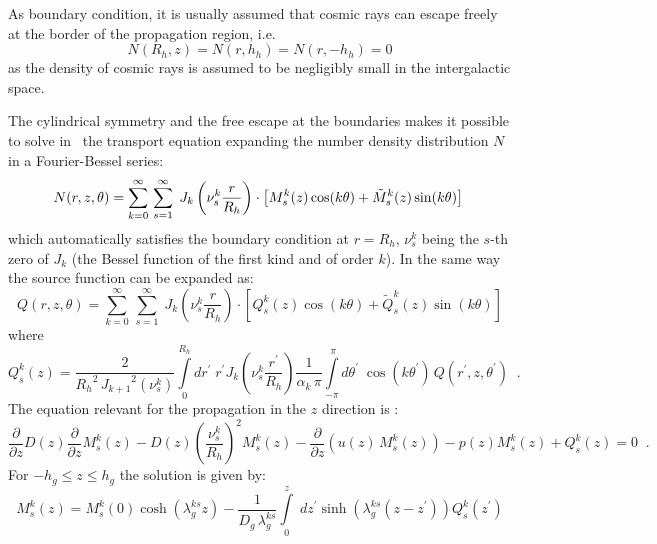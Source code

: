 As boundary condition, it is usually assumed that cosmic rays can escape
freely at the border of the propagation region, i.e.\
\begin{equation}
N(R_h,z) = N(r,h_h) = N(r,-h_h) = 0
\label{eq:bound}
\end{equation}
as the density of cosmic rays is assumed to be negligibly small in the
intergalactic space.

The cylindrical symmetry and the free escape at the
boundaries makes it possible
to solve in \ds\
the transport equation expanding the number density distribution $N$
in a Fourier-Bessel series:
\begin{equation}
N(r,z,\theta) = \sum_{k=0}^{\infty} \,\sum_{s=1}^{\infty} \;
J_k \left(\nu_s^k \frac{r}{R_h}\right) \cdot
\left[ M_s^k(z) \cos(k\theta) + \tilde{M}_s^k(z) \sin(k\theta)\right] \\
\end{equation}
which automatically satisfies the boundary condition at $r=R_h$,
$\nu_s^k$ being the $s$-th zero of $J_k$ (the Bessel function of the
first kind  and of order $k$).
In the same way the source function can be expanded as:
\begin{equation}
Q(r,z,\theta) = \sum_{k=0}^{\infty} \,\sum_{s=1}^{\infty} \;
J_k \left(\nu_s^k \frac{r}{R_h}\right) \cdot
\left[ Q_s^k(z) \cos(k\theta) + \tilde{Q}_s^k(z) \sin(k\theta)\right]
\end{equation}
where
\begin{equation}
Q_s^k(z) = \frac{2}{{R_h}^2\,{J_{k+1}}^2(\nu_s^k)}
\int\limits_0^{R_h} dr^{\prime} \;r^{\prime}
J_k \left(\nu_s^k \frac{r^{\prime}}{R_h}\right)
\frac{1}{\alpha_k\,\pi}
\int\limits_{-\pi}^{\;\pi} d\theta^{\prime} \; \cos(k\theta^{\prime})
\,Q(r^{\prime},z,\theta^{\prime})\;\;.
\end{equation}
The equation relevant for the propagation in the $z$ direction is \cite{pbar}:
\begin{equation}
\frac{\partial}{\partial{z}} D(z) \frac{\partial}{\partial{z}} M_s^k(z)
- D(z) \left(\frac{\nu_s^k}{R_h}\right)^2 M_s^k(z)
- \frac{\partial}{\partial{z}} \left(u(z)\,M_s^k(z) \right)
- p(z) M_s^k(z) + Q_s^k(z) =0 \;\;.
\end{equation}
For $-h_g \leq z \leq h_g$ the solution is given by:
\begin{equation}
M_s^k(z) = M_s^k(0) \cosh(\lambda_g^{ks} z) - \frac{1}{D_g\, \lambda_g^{ks}}
\int\limits_{0}^{z} \;dz^{\prime}
\sinh\left(\lambda_g^{ks} (z-z^{\prime})\right) Q_s^k(z^{\prime})
\label{eq:zdep}
\end{equation}
